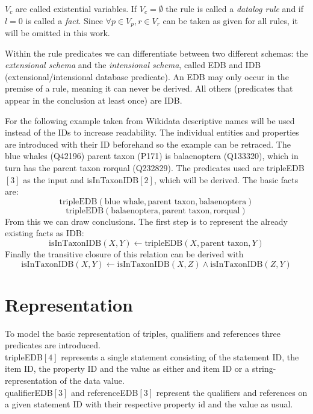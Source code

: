 \documentclass[hyperref,bachelorofscience,fleqn]{cgvpub}
\begin{document}
\(V_c\) are called existential variables. If \(V_c = \emptyset\) the rule is called a \emph{datalog rule} and if \(l = 0\) is called a \emph{fact}. Since \(\forall p \in V_p, r \in V_r\) can be taken as given for all rules, it will be omitted in this work.

Within the rule predicates we can differentiate between two different schemas: the \emph{extensional schema} and the \emph{intensional schema}, called EDB and IDB  (extensional/intensional database predicate). An EDB may only occur in the premise of a rule, meaning it can never be derived. All others (predicates that appear in the conclusion at least once) are IDB.

For the following example taken from Wikidata descriptive names will be used instead of the IDs to increase readability. The individual entities and properties are introduced with their ID beforehand so the example can be retraced. The blue whales (Q42196) parent taxon (P171) is balaenoptera (Q133320), which in turn has the parent taxon rorqual (Q232829). The predicates used are tripleEDB\([3]\) as the input and isInTaxonIDB\([2]\), which will be derived. The basic facts are:\\
\[\text{tripleEDB}(\text{blue whale}, \text{parent taxon}, \text{balaenoptera})\]
\[\text{tripleEDB}(\text{balaenoptera}, \text{parent taxon}, \text{rorqual})\]
From this we can draw conclusions. The first step is to represent the already existing facts as IDB:
\[\text{isInTaxonIDB}(X, Y) \leftarrow \text{tripleEDB}(X, \text{parent taxon}, Y)\]
Finally the transitive closure of this relation can be derived with
\[\text{isInTaxonIDB}(X, Y) \leftarrow \text{isInTaxonIDB}(X, Z) \wedge \text{isInTaxonIDB}(Z, Y)\]

\section{Representation}
To model the basic representation of triples, qualifiers and references three predicates are introduced.\\
tripleEDB\([4]\) represents a single statement consisting of the statement ID, the item ID, the property ID and the value as either and item ID or a string-representation of the data value.\\
qualifierEDB\([3]\) and referenceEDB\([3]\) represent the qualifiers and references on a given statement ID with their respective property id and the value as usual.\\
\end{document}
